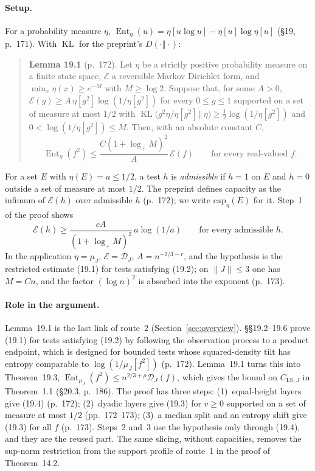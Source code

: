 \documentclass[11pt]{article}
\newcommand{\D}{\mathcal{D}}
\DeclareMathOperator{\Ent}{Ent}
\DeclareMathOperator{\KL}{KL}
\newcommand{\norm}[1]{\lVert #1\rVert}
\newcommand{\ploc}[2]{#1}
\begin{document}
\paragraph{Setup.}
For a probability measure $\eta$,
$\Ent_\eta(u)=\eta[u\log u]-\eta[u]\log\eta[u]$
\ploc{(\S19, p.~171)}{cap-entropy.tex:10--16}. With $\KL$ for the preprint's
$D(\cdot\Vert\cdot)$:
\begin{quote}
\textbf{Lemma 19.1} \ploc{(p.~172)}{cap-entropy.tex:44--64}. Let $\eta$ be a
strictly positive probability measure on a finite state space, $\mathcal E$ a
reversible Markov Dirichlet form, and $\min_x\eta(x)\ge e^{-M}$ with
$M\ge\log2$. Suppose that, for some $A>0$,
$\mathcal E(g)\ge A\,\eta[g^2]\log(1/\eta[g^2])$ for every $0\le g\le1$
supported on a set of measure at most $1/2$ with
$\KL\bigl(g^2\eta/\eta[g^2]\,\Vert\,\eta\bigr)\ge\frac12\log(1/\eta[g^2])$ and
$0<\log(1/\eta[g^2])\le M$. Then, with an absolute constant $C$,
\[
 \Ent_\eta(f^2)\le\frac{C(1+\log_+M)^2}{A}\,\mathcal E(f)
 \qquad\text{for every real-valued } f. \tag{19.3}
\]
\end{quote}
For a set $E$ with $\eta(E)=a\le1/2$, a test $h$ is \emph{admissible} if $h=1$
on $E$ and $h=0$ outside a set of measure at most $1/2$. The preprint defines
capacity as the infimum of $\mathcal E(h)$ over admissible $h$
(\ploc{p.~172}{cap-entropy.tex:91--92}); we write $\mathrm{cap}_\eta(E)$ for it.
Step~1 of the proof shows
\[
 \mathcal E(h)\ge\frac{cA}{(1+\log_+M)^2}\,a\log(1/a)
 \qquad\text{for every admissible } h. \tag{19.4}
\]
In the application $\eta=\mu_J$, $\mathcal E=\D_J$, $A=n^{-2/3-r}$, and the
hypothesis is the restricted estimate \ploc{(19.1)}{cap-entropy.tex:24--29} for
tests satisfying \ploc{(19.2)}{cap-entropy.tex:30--33}; on $\norm J\le3$ one
has $M=Cn$, and the factor $(\log n)^2$ is absorbed into the exponent
(\ploc{p.~173}{cap-entropy.tex:145--149}).

\paragraph{Role in the argument.}
Lemma~19.1 is the last link of route~2 (Section~\ref{sec:overview}).
\S\S19.2--19.6 prove (19.1) for tests satisfying (19.2) by following the
observation process to a product endpoint, which is designed for bounded tests
whose squared-density tilt has entropy comparable to $\log(1/\mu_J[f^2])$
(\ploc{p.~172}{cap-entropy.tex:34--37}). Lemma~19.1 turns this into
\ploc{Theorem~19.3}{cap-entropy.tex:856--874},
$\Ent_{\mu_J}(f^2)\le n^{2/3+\rho}\D_J(f)$, which gives the bound on
$C_{\mathrm{LS},J}$ in Theorem~1.1 (\ploc{\S20.3, p.~186}{dynamics.tex:196--199}).
The proof has three steps: (1)~equal-height layers give (19.4)
(\ploc{p.~172}{cap-entropy.tex:66--92}); (2)~dyadic layers give (19.3) for
$v\ge0$ supported on a set of measure at most $1/2$
(\ploc{pp.~172--173}{cap-entropy.tex:94--114}); (3)~a median split and an entropy
shift give (19.3) for all $f$ (\ploc{p.~173}{cap-entropy.tex:116--143}). Steps~2
and~3 use the hypothesis only through (19.4), and they are the reused part. The
same slicing, without capacities, removes the sup-norm restriction from the
support profile of route~1 in the proof of Theorem~14.2.
\end{document}
